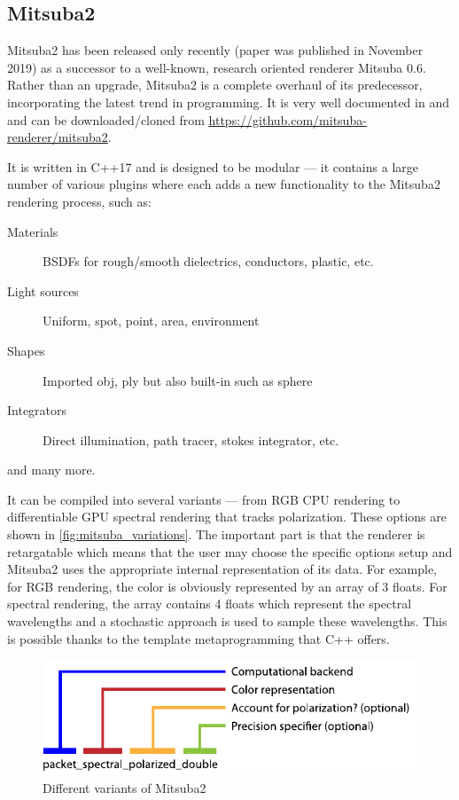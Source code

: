 \subsection{Mitsuba2}

Mitsuba2 has been released only recently (paper was published in November 2019) as a successor to a well-known, research oriented renderer Mitsuba 0.6. Rather than an upgrade, Mitsuba2 is a complete overhaul of its predecessor, incorporating the latest trend in programming. It is very well documented in \citet{mitsubaWeb} and \citet{nimier2019mitsuba} and can be downloaded/cloned from \url{https://github.com/mitsuba-renderer/mitsuba2}.

It is written in C++17 and is designed to be modular --- it contains a large number of various plugins where each adds a new functionality to the Mitsuba2 rendering process, such as:

\begin{description}
	\item[Materials] BSDFs for rough/smooth dielectrics, conductors, plastic, etc.
	\item[Light sources] Uniform, spot, point, area, environment
	\item[Shapes] Imported obj, ply but also built-in such as sphere
	\item[Integrators] Direct illumination, path tracer, stokes integrator, etc.
\end{description}

and many more.

It can be compiled into several variants --- from RGB CPU rendering to differentiable GPU spectral rendering that tracks polarization. These options are shown in \autoref{fig:mitsuba_variations}. The important part is that the renderer is retargatable which means that the user may choose the specific options setup and Mitsuba2 uses the appropriate internal representation of its data. For example, for RGB rendering, the color is obviously represented by an array of 3 floats. For spectral rendering, the array contains 4 floats which represent the spectral wavelengths and a stochastic approach is used to sample these wavelengths. This is possible thanks to the template metaprogramming that C++ offers.

\begin{figure}
	\centering
	\includegraphics[width=0.8\linewidth]{img/mitsuba_variants.pdf}
	\caption{Different variants of Mitsuba2}
	\label{fig:mitsuba_variations}
\end{figure}

